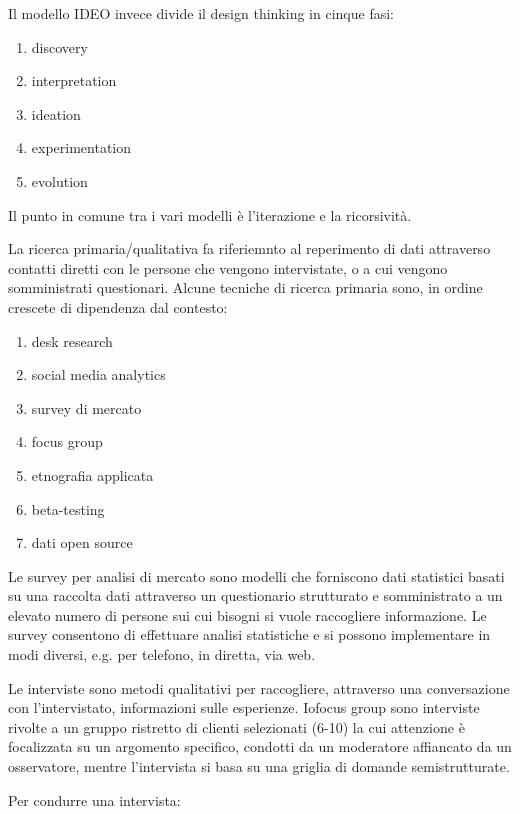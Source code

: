 \documentclass[answers, a4paper, 11pt]{exam}
\begin{document}
Il modello IDEO invece divide il design thinking in cinque fasi:

\begin{enumerate}
    \item discovery
    \item interpretation
    \item ideation
    \item experimentation
    \item evolution
\end{enumerate}
 
Il punto in comune tra i vari modelli è l'iterazione e la ricorsività.

La ricerca primaria/qualitativa fa riferiemnto al reperimento di dati attraverso contatti diretti con le persone che vengono intervistate, o a cui vengono somministrati questionari.
Alcune tecniche di ricerca primaria sono, in ordine crescete di dipendenza dal contesto:
\begin{enumerate}
    \item desk research
    \item social media analytics
    \item survey di mercato
    \item focus group
    \item etnografia applicata
    \item beta-testing
    \item dati open source
\end{enumerate}

Le survey per analisi di mercato sono modelli che forniscono dati statistici basati su una raccolta dati attraverso un questionario strutturato e somministrato a un elevato numero di persone sui cui bisogni si vuole raccogliere informazione.
Le survey consentono di effettuare analisi statistiche e si possono implementare in modi diversi, e.g. per telefono, in diretta, via web. 

Le interviste sono metodi qualitativi per raccogliere, attraverso una conversazione con l'intervistato, informazioni sulle esperienze. 
Iofocus group sono interviste rivolte a un gruppo ristretto di clienti selezionati (6-10) la cui attenzione è focalizzata su un argomento specifico, condotti da un moderatore affiancato da un osservatore, mentre l'intervista si basa su una griglia di domande semistrutturate.

Per condurre una intervista:
\end{document}
